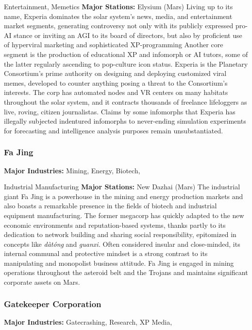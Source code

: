 Entertainment, Memetics
\textbf{Major Stations:} Elysium (Mars)
Living up to its name, Experia dominates the solar 
system's news, media, and entertainment market 
segments, generating controversy not only with its 
publicly expressed pro-AI stance or inviting an AGI 
to its board of directors, but also by proficient use 
of hyperviral marketing and sophisticated XP-programming
Another core segment is the production
of educational XP and infomorph or AI tutors, some 
of the latter regularly ascending to pop-culture icon 
status. Experia is the Planetary Consortium's prime 
authority on designing and deploying customized 
viral memes, developed to counter anything posing 
a threat to the Consortium's interests. The corp has 
automated nodes and VR centers on many habitats 
throughout the solar system, and it contracts thousands
of freelance lifeloggers as live, roving, citizen
journalistas. Claims by some infomorphs that Experia 
has illegally subjected indentured infomorphs to never-ending
simulation experiments for forecasting and
intelligence analysis purposes remain unsubstantiated.

\subsubsection{Fa Jing}

\textbf{Major Industries:} Mining, Energy, Biotech, 

Industrial Manufacturing
\textbf{Major Stations:} New Dazhai (Mars)
The industrial giant Fa Jing is a powerhouse in the 
mining and energy production markets and also 
boasts a remarkable presence in the fields of biotech 
and industrial equipment manufacturing. The former 
megacorp has quickly adapted to the new economic 
environments and reputation-based systems, thanks 
partly to its dedication to network building and sharing
social responsibility, epitomized in concepts like
\textit{dàtóng} and \textit{guanxi.} Often considered insular and 
close-minded, its internal communal and protective 
mindset is a strong contrast to its manipulating and 
monopolist business attitude. Fa Jing is engaged in 
mining operations throughout the asteroid belt and 
the Trojans and maintains significant corporate assets 
on Mars.

\subsubsection{Gatekeeper Corporation}

\textbf{Major Industries:} Gatecrashing, Research, XP Media, 

